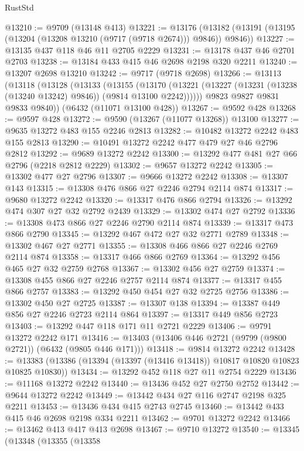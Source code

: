 \begin{lexlean}{RustStd}
\begin{coremodule}
@13210 := @9709 (@13148 @413)
@13221 := @13176
    (@13182 (@13191 (@13195 (@13204 (@13208 @13210 (@9717 (@9718 @2674))) @9846)) @9846))
@13227 := @13135 @437 @118 @46 @11 @2705 @2229
@13231 := @13178 @437 @46 @2701 @2703
@13238 := @13184 @433 @415 @46 @2698 @2198 @320 @2211
@13240 := @13207 @2698 @13210
@13242 := @9717 (@9718 @2698)
@13266 := @13113
    (@13118
      (@13128
        (@13133
          (@13155
            (@13170
              (@13221 (@13227 (@13231 (@13238 (@13240 @13242) @9846)) (@9814 @13100 @2242))))))
        @9823
        @9827
        @9831
        @9833
        @9840))
    (@6432 (@11071 @13100 @428))
@13267 := @9592 @428
@13268 := @9597 @428
@13272 := @9590 (@13267 (@11077 @13268)) @13100
@13277 := @9635 @13272 @483 @155 @2246 @2813
@13282 := @10482 @13272 @2242 @483 @155 @2813
@13290 := @10491 @13272 @2242 @477 @479 @27 @46 @2796 @2812
@13292 := @9689 @13272 @2242
@13300 := @13292 @477 @481 @27 @66 @2796 (@2218 @2812 @2229)
@13302 := @9657 @13272 @2242
@13305 := @13302 @477 @27 @2796
@13307 := @9666 @13272 @2242
@13308 := @13307 @143
@13315 := @13308 @476 @866 @27 @2246 @2794 @2114 @874
@13317 := @9680 @13272 @2242
@13320 := @13317 @476 @866 @2794
@13326 := @13292 @474 @307 @27 @32 @2792 @2439
@13329 := @13302 @474 @27 @2792
@13336 := @13308 @473 @866 @27 @2246 @2790 @2114 @874
@13339 := @13317 @473 @866 @2790
@13345 := @13292 @467 @472 @27 @32 @2771 @2789
@13348 := @13302 @467 @27 @2771
@13355 := @13308 @466 @866 @27 @2246 @2769 @2114 @874
@13358 := @13317 @466 @866 @2769
@13364 := @13292 @456 @465 @27 @32 @2759 @2768
@13367 := @13302 @456 @27 @2759
@13374 := @13308 @455 @866 @27 @2246 @2757 @2114 @874
@13377 := @13317 @455 @866 @2757
@13383 := @13292 @450 @454 @27 @32 @2725 @2756
@13386 := @13302 @450 @27 @2725
@13387 := @13307 @138
@13394 := @13387 @449 @856 @27 @2246 @2723 @2114 @864
@13397 := @13317 @449 @856 @2723
@13403 := @13292 @447 @118 @171 @11 @2721 @2229
@13406 := @9791 @13272 @2242 @171
@13416 := @13403 (@13406 @446 @2721 (@9799 (@9800 @2721)) (@6432 (@9805 @446 @171)))
@13418 := @9814 @13272 @2242
@13428 := @13383 (@13386 (@13394 (@13397 (@13416 @13418)) @10817 @10820 @10823 @10825 @10830))
@13434 := @13292 @452 @118 @27 @11 @2754 @2229
@13436 := @11168 @13272 @2242
@13440 := @13436 @452 @27 @2750 @2752
@13442 := @9644 @13272 @2242
@13449 := @13442 @434 @27 @116 @2747 @2198 @325 @2211
@13453 := @13436 @434 @415 @2743 @2745
@13460 := @13442 @433 @415 @46 @2698 @2198 @334 @2211
@13462 := @9701 @13272 @2242
@13466 := @13462 @413 @417 @413 @2698
@13467 := @9710 @13272
@13540 := @13345
    (@13348
      (@13355
        (@13358

\end{coremodule}
\end{lexlean}

